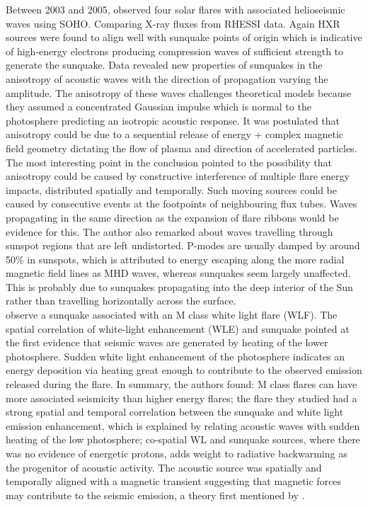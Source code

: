 \documentclass[11pt]{article}
\begin{document}
Between 2003 and 2005, \cite{2006SoPh..238....1K} observed four solar flares with associated helioseismic waves using SOHO. Comparing X-ray fluxes from RHESSI data. Again HXR sources were found to align well with sunquake points of origin which is indicative of high-energy electrons producing compression waves of sufficient strength to generate the sunquake. Data revealed new properties of sunquakes in the anisotropy of acoustic waves with the direction of propagation varying the amplitude. The anisotropy of these waves challenges theoretical models \citep{2000AcA....50..405M,2003SoPh..218..227P, 2005SoPh..232....1P} because they assumed a concentrated Gaussian impulse which is normal to the photosphere predicting an isotropic acoustic response. It was postulated that anisotropy could be due to a sequential release of energy + complex magnetic field geometry dictating the flow of plasma and direction of accelerated particles. The most interesting point in the conclusion pointed to the possibility that anisotropy could be caused by constructive interference of multiple flare energy impacts, distributed spatially and temporally. Such moving sources could be caused by consecutive events at the footpoints of neighbouring flux tubes. Waves propagating in the same direction as the expansion of flare ribbons would be evidence for this. The author also remarked about waves travelling through sunspot regions that are left undistorted. P-modes are usually damped by around 50\% in sunspots, which is attributed to energy escaping along the more radial magnetic field lines as MHD waves, whereas sunquakes seem largely unaffected. This is probably due to sunquakes propagating into the deep interior of the Sun rather than travelling horizontally across the surface. \\


\cite{2006SoPh..239..113D} observe a sunquake associated with an M class white light flare (WLF). The spatial correlation of white-light enhancement (WLE) and sunquake pointed at the first evidence that seismic waves are generated by heating of the lower photosphere. Sudden white light enhancement of the photosphere indicates an energy deposition via heating great enough to contribute to the observed emission released during the flare. In summary, the authors found: M class flares can have more associated seismicity than higher energy flares; the flare they studied had a strong spatial and temporal correlation between the sunquake and white light emission enhancement, which is explained by relating acoustic waves with sudden heating of the low photosphere; co-spatial WL and sunquake sources, where there was no evidence of energetic protons, adds weight to radiative backwarming as the progenitor of acoustic activity. The acoustic source was spatially and temporally aligned with a magnetic transient suggesting that magnetic forces may contribute to the seismic emission, a theory first mentioned by \cite{2001ApJ...550L.105K}. \\
\end{document}
